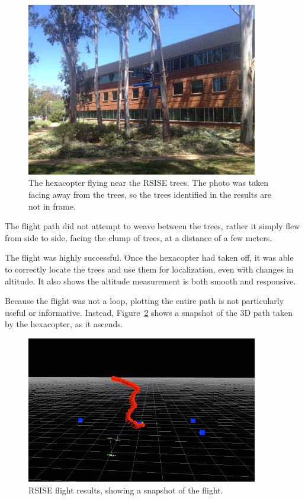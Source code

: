 \documentclass[12pt,oneside,a4paper]{book}
\begin{document}
\begin{figure}[h!]
  \centering
  \includegraphics[width=0.9\textwidth]{figs/rsise-flying}
  \caption{The hexacopter flying near the RSISE trees. The photo was
    taken facing away from the trees, so the trees identified in the
    results are not in frame.}
  \label{fig:rsise-flying}
\end{figure}

The flight path did not attempt to weave between the trees, rather it
simply flew from side to side, facing the clump of trees, at a
distance of a few meters.

The flight was highly successful. Once the hexacopter had taken off,
it was able to correctly locate the trees and use them for
localization, even with changes in altitude. It also shows the
altitude measurement is both smooth and responsive.

Because the flight was not a loop, plotting the entire path is not
particularly useful or informative. Instead,
Figure~\ref{fig:rsise-results} shows a snapshot of the 3D path taken by
the hexacopter, as it ascends.

\begin{figure}[h!]
  \centering
  \includegraphics[width=0.9\textwidth]{figs/rsise-flying-results}
  \caption{RSISE flight results, showing a snapshot of the
    flight.}
  \label{fig:rsise-results}
\end{figure}
\end{document}
